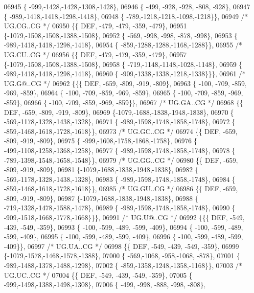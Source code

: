 \begin{DoxyCode}
06945 \{ -999,-1428,-1428,-1308,-1428\},
06946 \{ -499, -928, -928, -808, -928\},
06947 \{ -989,-1418,-1418,-1298,-1418\},
06948 \{ -789,-1218,-1218,-1098,-1218\}\},
06949 \textcolor{comment}{/* UG.CG..CG */}
06950 \{\{  DEF, -479, -479, -359, -479\},
06951 \{-1079,-1508,-1508,-1388,-1508\},
06952 \{ -569, -998, -998, -878, -998\},
06953 \{ -989,-1418,-1418,-1298,-1418\},
06954 \{ -859,-1288,-1288,-1168,-1288\}\},
06955 \textcolor{comment}{/* UG.CU..CG */}
06956 \{\{  DEF, -479, -479, -359, -479\},
06957 \{-1079,-1508,-1508,-1388,-1508\},
06958 \{ -719,-1148,-1148,-1028,-1148\},
06959 \{ -989,-1418,-1418,-1298,-1418\},
06960 \{ -909,-1338,-1338,-1218,-1338\}\}\},
06961 \textcolor{comment}{/* UG.G@..CG */}
06962 \{\{\{  DEF, -659, -809, -919, -809\},
06963 \{ -100, -709, -859, -969, -859\},
06964 \{ -100, -709, -859, -969, -859\},
06965 \{ -100, -709, -859, -969, -859\},
06966 \{ -100, -709, -859, -969, -859\}\},
06967 \textcolor{comment}{/* UG.GA..CG */}
06968 \{\{  DEF, -659, -809, -919, -809\},
06969 \{-1079,-1688,-1838,-1948,-1838\},
06970 \{ -569,-1178,-1328,-1438,-1328\},
06971 \{ -989,-1598,-1748,-1858,-1748\},
06972 \{ -859,-1468,-1618,-1728,-1618\}\},
06973 \textcolor{comment}{/* UG.GC..CG */}
06974 \{\{  DEF, -659, -809, -919, -809\},
06975 \{ -999,-1608,-1758,-1868,-1758\},
06976 \{ -499,-1108,-1258,-1368,-1258\},
06977 \{ -989,-1598,-1748,-1858,-1748\},
06978 \{ -789,-1398,-1548,-1658,-1548\}\},
06979 \textcolor{comment}{/* UG.GG..CG */}
06980 \{\{  DEF, -659, -809, -919, -809\},
06981 \{-1079,-1688,-1838,-1948,-1838\},
06982 \{ -569,-1178,-1328,-1438,-1328\},
06983 \{ -989,-1598,-1748,-1858,-1748\},
06984 \{ -859,-1468,-1618,-1728,-1618\}\},
06985 \textcolor{comment}{/* UG.GU..CG */}
06986 \{\{  DEF, -659, -809, -919, -809\},
06987 \{-1079,-1688,-1838,-1948,-1838\},
06988 \{ -719,-1328,-1478,-1588,-1478\},
06989 \{ -989,-1598,-1748,-1858,-1748\},
06990 \{ -909,-1518,-1668,-1778,-1668\}\}\},
06991 \textcolor{comment}{/* UG.U@..CG */}
06992 \{\{\{  DEF, -549, -439, -549, -359\},
06993 \{ -100, -599, -489, -599, -409\},
06994 \{ -100, -599, -489, -599, -409\},
06995 \{ -100, -599, -489, -599, -409\},
06996 \{ -100, -599, -489, -599, -409\}\},
06997 \textcolor{comment}{/* UG.UA..CG */}
06998 \{\{  DEF, -549, -439, -549, -359\},
06999 \{-1079,-1578,-1468,-1578,-1388\},
07000 \{ -569,-1068, -958,-1068, -878\},
07001 \{ -989,-1488,-1378,-1488,-1298\},
07002 \{ -859,-1358,-1248,-1358,-1168\}\},
07003 \textcolor{comment}{/* UG.UC..CG */}
07004 \{\{  DEF, -549, -439, -549, -359\},
07005 \{ -999,-1498,-1388,-1498,-1308\},
07006 \{ -499, -998, -888, -998, -808\},

\end{DoxyCode}

